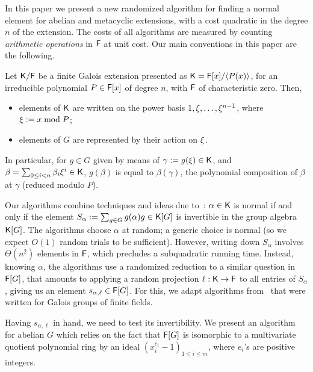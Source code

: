 In this paper we present a new randomized algorithm for finding a normal
element for abelian and metacyclic extensions, with a cost quadratic
in the degree $n$ of the extension. The costs of all algorithms are
measured by counting \emph{arithmetic operations} in ${\mathsf{F}}$ at unit cost.
Our main conventions in this paper are the following.
\begin{assumption}
  \label{assum}
  Let ${\mathsf{K}}/{\mathsf{F}}$ be a finite Galois extension presented as
  ${\mathsf{K}}={\mathsf{F}}[x]/\langle P(x)\rangle$, for an irreducible polynomial $P\in
  {\mathsf{F}}[x]$ of degree $n$, with ${\mathsf{F}}$ of characteristic zero. Then,
  \begin{itemize}
  \item elements of ${\mathsf{K}}$ are written on the power basis $1,\xi,\dots,\xi^{n-1}$,
    where $\xi := x \bmod P$;
  \item elements of $G$ are represented by their action on $\xi$.
  \end{itemize}
\end{assumption}

In particular, for $g \in G$ given by means of $\gamma:=g(\xi) \in {\mathsf{K}}$,
and $\beta = \sum_{0\leq i<n}\beta_i\xi^i\in{\mathsf{K}}$,  $g(\beta)$ is equal to $\beta(\gamma)$, the
polynomial composition of $\beta$ at $\gamma$ (reduced modulo $P$).

Our algorithms combine techniques and ideas due
to~\cite{GatGie90,KalSho98}: $\alpha \in {\mathsf{K}}$ is normal if and only if
the element $S_\alpha := \sum_{g \in G} g(\alpha)g \in {\mathsf{K}}[G]$ is
invertible in the group algebra ${\mathsf{K}}[G]$. The algorithms choose
$\alpha$ at random; a generic choice is normal (so we expect $O(1)$
random trials to be sufficient). However, writing down $S_\alpha$
involves $\Theta(n^2)$ elements in ${\mathsf{F}}$, which precludes a
subquadratic running time. Instead, knowing $\alpha$, the algorithms use a
randomized reduction to a similar question in ${\mathsf{F}}[G]$, that amounts to
applying a random projection $\ell:{\mathsf{K}}\to{\mathsf{F}}$ to all entries of
$S_\alpha$, giving us an element $s_{\alpha,\ell} \in {\mathsf{F}}[G]$. For
this, we adapt algorithms from~\cite{KalSho98} that were written for
Galois groups of finite fields.

Having $s_{\alpha,\ell}$ in hand, we need to test its
invertibility. We present an algorithm for 
abelian $G$ which relies on the fact that ${\mathsf{F}}[G]$ is isomorphic to a
multivariate quotient polynomial ring by an ideal $(x^{e_i}_i-1)_{1
  \leq i \leq m}$, where $e_i$'s are positive integers. 

